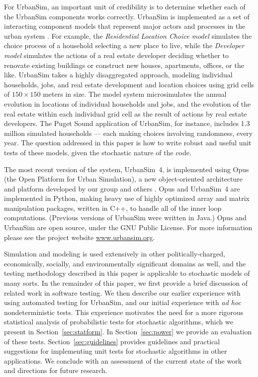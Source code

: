 \documentclass{sig-alternate-preprint}
\begin{document}
For UrbanSim, an important unit of credibility is to determine whether each
of the UrbanSim components works correctly.  UrbanSim is implemented as a
set of interacting component models that represent major actors and
processes in the urban system \cite{noth-ceus-2003}.  For example, the
\emph{Residential Location Choice model} simulates the choice process of a
household selecting a new place to live, while the \emph{Developer model}
simulates the actions of a real estate developer deciding whether to
renovate existing buildings or construct new houses, apartments, offices,
or the like.  UrbanSim takes a highly disaggregated approach, modeling
individual households, jobs, and real estate development and location
choices using grid cells of $150\times 150$ meters in size.  The model
system microsimulates the annual evolution in locations of individual
households and jobs, and the evolution of the real estate within each
individual grid cell as the result of actions by real estate developers.
The Puget Sound application of UrbanSim, for instance, includes 1.3 million
simulated households --- each making choices involving randomness, every
year.  The question addressed in this paper is how to write robust and
useful unit tests of these models, given the stochastic nature of the code.

The most recent version of the system, UrbanSim~4, is implemented using
Opus (the Open Platform for Urban Simulation), a new object-oriented
architecture and platform developed by our group and others
\cite{waddell-opus-2005}.  Opus and UrbanSim~4 are implemented in Python,
making heavy use of highly optimized array and matrix manipulation
packages, written in C++, to handle all of the inner loop computations.
(Previous versions of UrbanSim 
were written in Java.)  Opus and UrbanSim are open source, under
the GNU Public License.  For more information please see the project
website \url{www.urbansim.org}.

Simulation and modeling is used extensively in other politically-charged,
economically, socially, and environmentally significant domains as well,
and the testing methodology described in this paper is applicable to
stochastic models of many sorts.  In the remainder of this paper, we first
provide a brief discussion of related work in software testing.  We then
describe our earlier experience with using automated testing for UrbanSim,
and our initial experience with \emph{ad hoc} nondeterministic tests.  This
experience motivates the need for a more rigorous statistical analysis of
probabilistic tests for stochastic algorithms, which we present in
Section~\ref{sec:statform}.  In Section~\ref{sec:power} we provide an
evaluation of these tests.  Section~\ref{sec:guidelines} provides
guidelines and practical suggestions for implementing unit tests for
stochastic algorithms in other applications.  We conclude with an
assessment of the current state of the work and directions for future
research.
\end{document}
